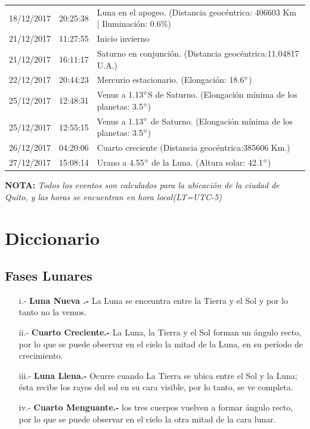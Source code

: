 \documentclass[12pt,a4paper,oneside]{article}
\begin{document}
\begin{center}
\begin{tabular}{ |l| l| l| }
18/12/2017& 20:25:38 &	Luna en el apogeo. (Distancia geocéntrica: 406603 Km | Iluminación: 0.6\%)	\\
21/12/2017& 11:27:55 &	Inicio invierno	\\
21/12/2017& 16:11:17 &	Saturno en conjunción. (Distancia geocéntrica:11.04817 U.A.)	\\
22/12/2017& 20:44:23 &	Mercurio estacionario. (Elongación: 18.6$\degree $)	\\
25/12/2017& 12:48:31 &	Venus a 1.13$\degree $S de Saturno. (Elongación mínima de los planetas: 3.5$\degree $)	\\
25/12/2017& 12:55:15 &	Venus a 1.13$\degree $ de Saturno. (Elongación mínima de los planetas: 3.5$\degree $)	\\
26/12/2017& 04:20:06 &	Cuarto creciente (Distancia geocéntrica:385606 Km.)	\\
27/12/2017& 15:08:14 &	Urano a 4.55$\degree $ de la Luna. (Altura solar: 42.1$\degree $)	\\
\hline
\end{tabular}
\end{center}

\vspace{1cm}
\textbf{NOTA:  }\textit{Todos los eventos son calculados para la ubicaci\'on de la ciudad de Quito, y las horas se encuentran en hora local(LT=UTC-5)}
\vspace{0.7cm}

\newpage

\section{Diccionario}

\subsection{Fases Lunares}
\begin{itemize}
\item [i.-]\textbf{Luna Nueva .-} La Luna se enceuntra entre la Tierra y el Sol y por lo tanto no la vemos.

\item[ii.-]\textbf{Cuarto Creciente.-} La Luna, la Tierra y el Sol forman un ángulo recto, por lo que se puede observar en el cielo la mitad de la Luna, en su período de crecimiento.

\item[iii.-]\textbf{Luna Llena.-} Ocurre cuando La Tierra se ubica entre el Sol y la Luna; ésta recibe los rayos del sol en su cara visible, por lo tanto, se ve completa.
\item [iv.-]\textbf{ Cuarto Menguante.-} los tres cuerpos vuelven a formar ángulo recto, por lo que se puede observar en el cielo la otra mitad de la cara lunar.

\end{itemize}
\end{document}

